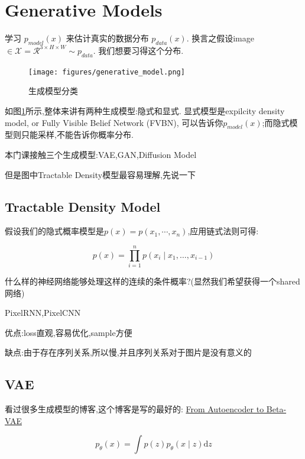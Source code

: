 \section{Generative Models}
	学习 $p_{model}(x)$ 来估计真实的数据分布 $p_{data}(x)$.
	换言之假设image$ \in \mathcal{X} = \mathcal{R}^{3\times H \times W}\sim p_{data}$.
	我们想要习得这个分布.

	\begin{figure}[htbp]
	\centering
	\texttt{[image: figures/generative\_model.png]}
	\caption{生成模型分类}
	\label{fig:generative_model}
	\end{figure}

	如图\ref{fig:generative_model}所示,整体来讲有两种生成模型:隐式和显式.
	显式模型是expilcity density model, or Fully Visible Belief Network (FVBN), 
	可以告诉你$p_{model}(x)$;而隐式模型则只能采样,不能告诉你概率分布.
	
	本门课接触三个生成模型:VAE,GAN,Diffusion Model
	
	但是图中Tractable Density模型最容易理解,先说一下

	\subsection{Tractable Density Model}

	假设我们的隐式概率模型是$p(x) = p(x_1, \cdots, x_n)$,应用链式法则可得:
	
	\begin{equation}
		p(x)=\prod_{i=1}^{n} p\left(x_{i} \mid x_{1}, \ldots, x_{i-1}\right)
	\end{equation}
	
	什么样的神经网络能够处理这样的连续的条件概率?(显然我们希望获得一个shared网络)
	
	PixelRNN,PixelCNN
	
	优点:loss直观,容易优化,sample方便
	
	缺点:由于存在序列关系,所以慢,并且序列关系对于图片是没有意义的
	
	\subsection{VAE}

	看过很多生成模型的博客,这个博客是写的最好的:
	\href{https://lilianweng.github.io/posts/2018-08-12-vae/}
	{From Autoencoder to Beta-VAE}
	
	\begin{equation}
		p_{\theta}(x)=\int p(z) p_{\theta}(x \mid z) \mathrm{d}z
	\end{equation} 
	
